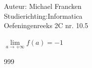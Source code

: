\documentclass[a4paper]{article}
\begin{document}
\noindent \large Auteur: Michael Francken \\
\noindent \large Studierichting:Informatica\\
\noindent \large Oefeningenreeks 2C nr. 10.5\\

\medskip

\normalsize

$\lim\limits_{a\rightarrow +\infty} f(a) = -1$\\


\begin{thebibliography}{999}
\end{thebibliography}
\end{document}
